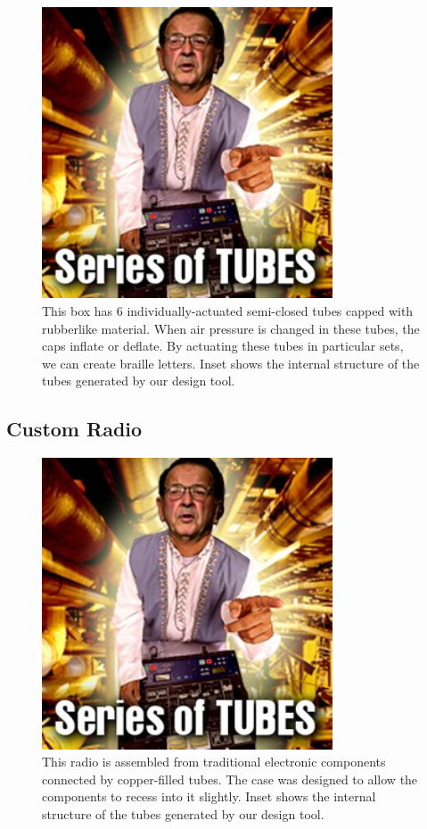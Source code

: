 \begin{figure}[h]
\centering
    \includegraphics[width=3.4in]{figures/series-of-tubes.jpg}
\caption{This box has 6 individually-actuated semi-closed tubes capped with rubberlike material.  When air pressure is changed in these tubes, the caps inflate or deflate.  By actuating these tubes in particular sets, we can create braille letters.  Inset shows the internal structure of the tubes generated by our design tool.}
\label{fig:braille}
\end{figure}

\subsection{Custom Radio}

\begin{figure}[h]
\centering
    \includegraphics[width=3.4in]{figures/series-of-tubes.jpg}
\caption{This radio is assembled from traditional electronic components connected by copper-filled tubes.  The case was designed to allow the components to recess into it slightly.  Inset shows the internal structure of the tubes generated by our design tool.}
\label{fig:radio}
\end{figure}


